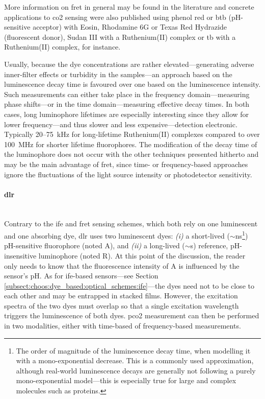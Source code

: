 More information on \gls{fret} in general may be found in the literature\cite{mills2009, valeur2001_chap9} and concrete applications to \gls{co2} sensing were also published using phenol red or \gls{btb} (pH-sensitive acceptor) with Eosin, Rhodamine 6G or Texas Red Hydrazide (fluorescent donor)\cite{lakowicz1993}, Sudan III with a Ruthenium(II) complex\cite{bultzingslowen2003} or \gls{tb} with a Ruthenium(II) complex\cite{neurauter1999}, for instance.

Usually, because the dye concentrations are rather elevated---generating adverse inner-filter effects or turbidity in the samples---an approach based on the luminescence decay time is favoured over one based on the luminescence intensity. Such measurements can either take place in the frequency domain---measuring phase shifts\cite{lakowicz1993, bultzingslowen2003}---or in the time domain---measuring effective decay times\cite{neurauter1999}. In both cases, long luminophore lifetimes are especially interesting since they allow for lower frequency---and thus slower and less expensive---detection electronic. Typically 20--75~kHz for long-lifetime Ruthenium(II) complexes\cite{bultzingslowen2003, neurauter1999} compared to over 100~MHz for shorter lifetime fluorophores\cite{lakowicz1993}. The modification of the decay time of the luminophore does not occur with the other techniques presented hitherto and may be the main advantage of \gls{fret}, since time- or frequency-based approaches ignore the fluctuations of the light source intensity or photodetector sensitivity.

\paragraph{\texorpdfstring{\gls{dlr}}{DLR}}\label{subsect:choos:dye_based:optical_schemes:dlr_intro}\mbox{}\\

Contrary to the \gls{ife} and \gls{fret} sensing schemes, which both rely on one luminescent and one absorbing dye, \gls{dlr} uses two luminescent dyes: \textit{(i)} a short-lived ($\sim$ns\footnote{The order of magnitude of the luminescence decay time, when modelling it with a mono-exponential decrease. This is a commonly used approximation, although real-world luminescence decays are generally not following a purely mono-exponential model---this is especially true for large and complex molecules such as proteins\cite{wlodarczyk2003}.\label{footnote:monoexp}}) pH-sensitive fluorophore (noted A), and \textit{(ii)} a long-lived ($\sim${\textmu}s) reference, pH-insensitive luminophore (noted R). At this point of the discussion, the reader only needs to know that the fluorescence intensity of A is influenced by the sensor's pH. As for \gls{ife}-based sensors---see Section \ref{subsect:choos:dye_based:optical_schemes:ife}---the dyes need not to be close to each other and may be entrapped in stacked films\cite{aguayolopez2014}. However, the excitation spectra of the two dyes must overlap so that a single excitation wavelength triggers the luminescence of both dyes. \gls{pco2} measurement can then be performed in two modalities, either with time-based of frequency-based measurements.

